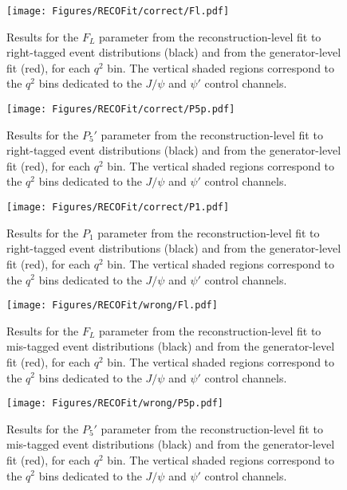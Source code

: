 \begin{figure}[!hbt]
  \centering
  \texttt{[image: Figures/RECOFit/correct/Fl.pdf]}
  \caption{Results for the $F_L$ parameter from the reconstruction-level fit to right-tagged event distributions (black) and from the generator-level fit (red), for each $q^2$ bin.
    The vertical shaded regions correspond to the $q^2$ bins dedicated to the $J/\psi$ and $\psi'$ control channels.}
  \label{fig:correct-closure-fl}
\end{figure}


\begin{figure}[!hbt]
  \centering
  \texttt{[image: Figures/RECOFit/correct/P5p.pdf]}
  \caption{Results for the $P_5'$ parameter from the reconstruction-level fit to right-tagged event distributions (black) and from the generator-level fit (red), for each $q^2$ bin.
    The vertical shaded regions correspond to the $q^2$ bins dedicated to the $J/\psi$ and $\psi'$ control channels.}
  \label{fig:correct-closure-p5p}
\end{figure}

\begin{figure}[!hbt]
  \centering
  \texttt{[image: Figures/RECOFit/correct/P1.pdf]}
  \caption{Results for the $P_1$ parameter from the reconstruction-level fit to right-tagged event distributions (black) and from the generator-level fit (red), for each $q^2$ bin.
    The vertical shaded regions correspond to the $q^2$ bins dedicated to the $J/\psi$ and $\psi'$ control channels.}
  \label{fig:correct-closure-p1}
\end{figure}

\begin{figure}[!hbt]
  \centering
  \texttt{[image: Figures/RECOFit/wrong/Fl.pdf]}
  \caption{Results for the $F_L$ parameter from the reconstruction-level fit to mis-tagged event distributions (black) and from the generator-level fit (red), for each $q^2$ bin.
    The vertical shaded regions correspond to the $q^2$ bins dedicated to the $J/\psi$ and $\psi'$ control channels.}
  \label{fig:wrong-closure-fl}
\end{figure}


\begin{figure}[!hbt]
  \centering
  \texttt{[image: Figures/RECOFit/wrong/P5p.pdf]}
  \caption{Results for the $P_5'$ parameter from the reconstruction-level fit to mis-tagged event distributions (black) and from the generator-level fit (red), for each $q^2$ bin.
    The vertical shaded regions correspond to the $q^2$ bins dedicated to the $J/\psi$ and $\psi'$ control channels.}
  \label{fig:wrong-closure-p5p}
\end{figure}

